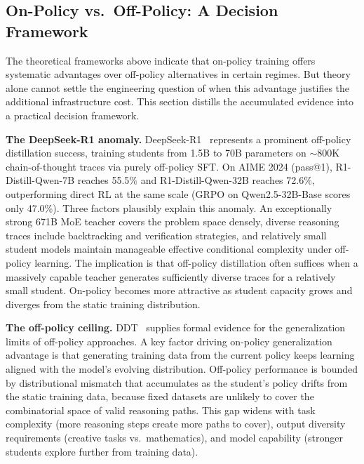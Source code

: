 \documentclass{article} %
\begin{document}
\subsection{On-Policy vs.\ Off-Policy: A Decision Framework}
\label{subsec:on_vs_off}

The theoretical frameworks above indicate that on-policy training offers systematic advantages over off-policy alternatives in certain regimes. But theory alone cannot settle the engineering question of when this advantage justifies the additional infrastructure cost. This section distills the accumulated evidence into a practical decision framework.

\textbf{The DeepSeek-R1 anomaly.} DeepSeek-R1~\citep{2501.12948} represents a prominent off-policy distillation success, training students from 1.5B to 70B parameters on $\sim$800K chain-of-thought traces via purely off-policy SFT. On AIME 2024 (pass@1), R1-Distill-Qwen-7B reaches 55.5\% and R1-Distill-Qwen-32B reaches 72.6\%, outperforming direct RL at the same scale (GRPO on Qwen2.5-32B-Base scores only 47.0\%). Three factors plausibly explain this anomaly. An exceptionally strong 671B MoE teacher covers the problem space densely, diverse reasoning traces include backtracking and verification strategies, and relatively small student models maintain manageable effective conditional complexity under off-policy learning. The implication is that off-policy distillation often suffices when a massively capable teacher generates sufficiently diverse traces for a relatively small student. On-policy becomes more attractive as student capacity grows and diverges from the static training distribution.

\textbf{The off-policy ceiling.} DDT~\citep{2602.12222} supplies formal evidence for the generalization limits of off-policy approaches. A key factor driving on-policy generalization advantage is that generating training data from the current policy keeps learning aligned with the model's evolving distribution. Off-policy performance is bounded by distributional mismatch that accumulates as the student's policy drifts from the static training data, because fixed datasets are unlikely to cover the combinatorial space of valid reasoning paths. This gap widens with task complexity (more reasoning steps create more paths to cover), output diversity requirements (creative tasks vs.\ mathematics), and model capability (stronger students explore further from training data).
\end{document}
